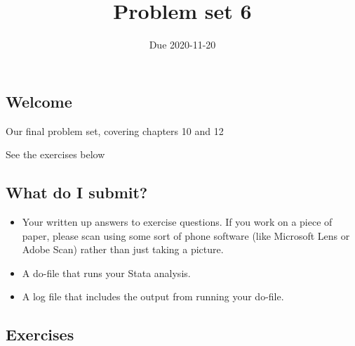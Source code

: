 \documentclass[
]{article}
\title{Problem set 6}
\author{}
\date{Due 2020-11-20}
\providecommand{\tightlist}{%
  \setlength{\itemsep}{0pt}\setlength{\parskip}{0pt}}
\begin{document}
\maketitle

\hypertarget{welcome}{%
\subsection{Welcome}\label{welcome}}

Our final problem set, covering chapters 10 and 12

See the exercises below

\hypertarget{what-do-i-submit}{%
\subsection{What do I submit?}\label{what-do-i-submit}}

\begin{itemize}
\tightlist
\item
  Your written up answers to exercise questions. If you work on a piece
  of paper, please scan using some sort of phone software (like
  Microsoft Lens or Adobe Scan) rather than just taking a picture.
\item
  A do-file that runs your Stata analysis.
\item
  A log file that includes the output from running your do-file.
\end{itemize}

\hypertarget{exercises}{%
\subsection{Exercises}\label{exercises}}
\end{document}
